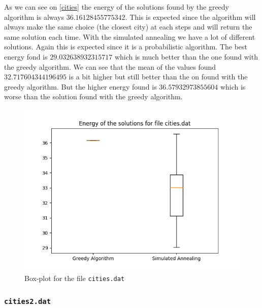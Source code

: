 \documentclass[14pt]
{article}
\begin{document}
As we can see on \autoref{cities} the energy of the solutions found by the greedy algorithm is always $36.16128455775342$. This is expected since the algorithm will always make the same choice (the closest city) at each steps and will return the same solution each time. With the simulated annealing we have a lot of different solutions. Again this is expected since it is a probabilistic algorithm. The best energy fond is  $29.032638932315717$ which is much better than the one found with the greedy algorithm. We can see that the mean of the values found $32.717604344196495$ is a bit higher but still better than the on found with the greedy algorithm. But the higher energy found is $36.57932973855604$ which is worse than the solution found with the greedy algorithm. 

\begin{figure}[H]
\center
\includegraphics[scale=0.5]{img/box_cities.png}
\caption{\label{cities} Box-plot for the file \texttt{cities.dat}}
\end{figure}

\subsubsection{\texttt{cities2.dat}}
\end{document}
